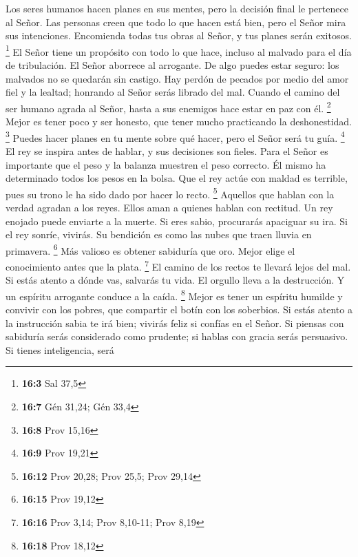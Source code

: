  Los seres humanos hacen planes en sus mentes, pero la
decisión final le pertenece al Señor.  Las personas creen
que todo lo que hacen está bien, pero el Señor mira sus intenciones.
 Encomienda todas tus obras al Señor, y tus planes serán
exitosos. \footnote{\textbf{16:3} Sal 37,5}  El Señor
tiene un propósito con todo lo que hace, incluso al malvado para el día
de tribulación.  El Señor aborrece al arrogante. De algo
puedes estar seguro: los malvados no se quedarán sin castigo.
 Hay perdón de pecados por medio del amor fiel y la
lealtad; honrando al Señor serás librado del mal.  Cuando
el camino del ser humano agrada al Señor, hasta a sus enemigos hace
estar en paz con él. \footnote{\textbf{16:7} Gén 31,24; Gén 33,4}
 Mejor es tener poco y ser honesto, que tener mucho
practicando la deshonestidad. \footnote{\textbf{16:8} Prov 15,16}
 Puedes hacer planes en tu mente sobre qué hacer, pero el
Señor será tu guía. \footnote{\textbf{16:9} Prov 19,21} 
El rey se inspira antes de hablar, y sus decisiones son fieles.
 Para el Señor es importante que el peso y la balanza
muestren el peso correcto. Él mismo ha determinado todos los pesos en la
bolsa.  Que el rey actúe con maldad es terrible, pues su
trono le ha sido dado por hacer lo recto. \footnote{\textbf{16:12} Prov
  20,28; Prov 25,5; Prov 29,14}  Aquellos que hablan con
la verdad agradan a los reyes. Ellos aman a quienes hablan con rectitud.
 Un rey enojado puede enviarte a la muerte. Si eres
sabio, procurarás apaciguar su ira.  Si el rey sonríe,
vivirás. Su bendición es como las nubes que traen lluvia en primavera.
\footnote{\textbf{16:15} Prov 19,12}  Más valioso es
obtener sabiduría que oro. Mejor elige el conocimiento antes que la
plata. \footnote{\textbf{16:16} Prov 3,14; Prov 8,10-11; Prov 8,19}
 El camino de los rectos te llevará lejos del mal. Si
estás atento a dónde vas, salvarás tu vida.  El orgullo
lleva a la destrucción. Y un espíritu arrogante conduce a la caída.
\footnote{\textbf{16:18} Prov 18,12}  Mejor es tener un
espíritu humilde y convivir con los pobres, que compartir el botín con
los soberbios.  Si estás atento a la instrucción sabia te
irá bien; vivirás feliz si confías en el Señor.  Si
piensas con sabiduría serás considerado como prudente; si hablas con
gracia serás persuasivo.  Si tienes inteligencia, será
